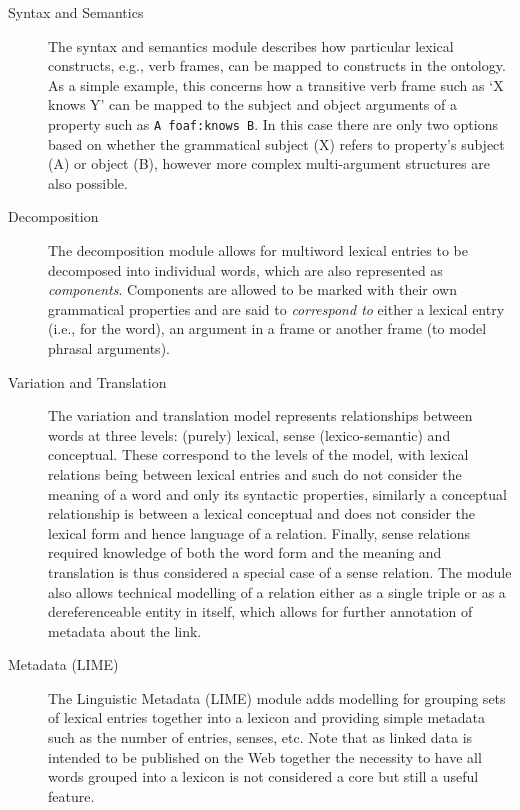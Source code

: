 \documentclass[12pt,a4paper]{elex2017}
\begin{document}
\begin{description}
    \item[Syntax and Semantics] The syntax and semantics module describes how
        particular lexical constructs, e.g., verb frames, can be mapped to
        constructs in the ontology. As a simple example, this concerns how a
        transitive verb frame such as `X knows Y' can be mapped to the subject
        and object arguments of a property such as \texttt{A foaf:knows B}. In this
        case there are only two options based on whether the grammatical subject
        (X) refers to property's subject (A) or object (B), however more complex
        multi-argument structures are also possible.
    \item[Decomposition] The decomposition module allows for multiword lexical
        entries to be decomposed into individual words, which are also
        represented as \emph{components}. Components are allowed to be marked
        with their own grammatical properties and are said to \emph{correspond
        to} either a lexical entry (i.e., for the word), an argument in a frame
        or another frame (to model phrasal arguments). 
    \item[Variation and Translation] The variation and translation model
        represents relationships between words at three levels: (purely)
        lexical, sense (lexico-semantic) and conceptual. These correspond
        to the levels of the model, with lexical relations being between lexical
        entries and such do not consider the meaning of a word and only its
        syntactic properties, similarly a conceptual relationship is between a
        lexical conceptual and does not consider the lexical form and hence
        language of a relation. Finally, sense relations required knowledge of
        both the word form and the meaning and translation is thus considered a
        special case of a sense relation. The module also allows technical
        modelling of a relation either as a single triple or as a
        dereferenceable entity in itself, which allows for further annotation of
        metadata about the link.
    \item[Metadata (LIME)] The Linguistic Metadata (LIME) module adds modelling
        for grouping sets of lexical entries together into a lexicon and
        providing simple metadata such as the number of entries, senses, etc.
        Note that as linked data is intended to be published on the Web together
        the necessity to have all words grouped into a lexicon is not considered
        a core but still a useful feature.
\end{description}
\end{document}
